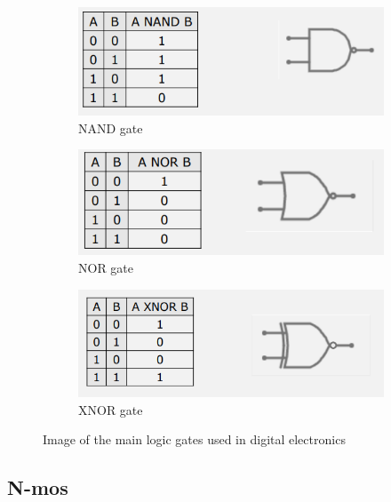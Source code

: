 \documentclass{article}
\begin{document}
\begin{figure}[h]
    \centering
    \begin{subfigure}{.49\textwidth}
        \centering
        \includegraphics[width=\linewidth]{IM_NAND.PNG}
        \caption{NAND gate}
        \label{NAND}
    \end{subfigure}
    \hfill
    \begin{subfigure}{.49\textwidth}
        \centering
        \includegraphics[width=\linewidth]{IM_NOR.PNG}
        \caption{NOR gate}
        \label{NOR}        
    \end{subfigure}
    
    \centering
    \begin{subfigure}{.49\textwidth}
        \centering
        \includegraphics[width=\linewidth]{IM_XNOR.PNG}
        \caption{XNOR gate}
        \label{XNOR}
    \end{subfigure}
\label{Logic_Gates}
\caption{Image of the main logic gates used in digital electronics}
\end{figure}


\subsection{N-mos}
\end{document}
